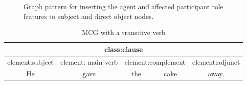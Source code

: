 \begin{figure}[H]
\centering
{}
\caption{Graph pattern for inserting the agent and affected participant role features to subject and direct object nodes.}
\label{fig:gp2}
\end{figure}

\begin{table}[ht]
\centering
\begin{tabular}{|c|c|c|c|c|}
\hline
\multicolumn{5}{|c|}{class:clause}                                                               \\ \hline
element:subject & element: main verb & \multicolumn{2}{c|}{element:complement} & element:adjunct \\ \hline
He              & gave               & the               & cake               & away.            \\ \hline
\end{tabular}
\caption{MCG with a transitive verb}
\label{tab:transitive1}
\end{table}

